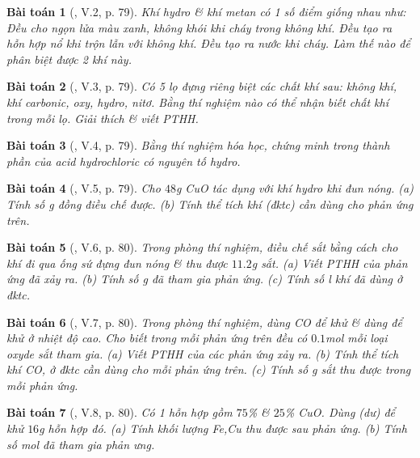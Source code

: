 \documentclass{article}
\newtheorem{baitoan}{Bài toán}
\begin{document}
\begin{baitoan}[\cite{Truong_BTNC_Hoa_Hoc_8_2022}, V.2, p. 79]
	Khí hydro \& khí metan có 1 số điểm giống nhau như: Đều cho ngọn lửa màu xanh, không khói khi cháy trong không khí. Đều tạo ra hỗn hợp nổ khi trộn lẫn với không khí. Đều tạo ra nước khi cháy. Làm thế nào để phân biệt được 2 khí này.
\end{baitoan}

\begin{baitoan}[\cite{Truong_BTNC_Hoa_Hoc_8_2022}, V.3, p. 79]
	Có 5 lọ đựng riêng biệt các chất khí sau: không khí, khí carbonic, oxy, hydro, nitơ. Bằng thí nghiệm nào có thể nhận biết chất khí trong mỗi lọ. Giải thích \& viết PTHH.
\end{baitoan}

\begin{baitoan}[\cite{Truong_BTNC_Hoa_Hoc_8_2022}, V.4, p. 79]
	Bằng thí nghiệm hóa học, chứng minh trong thành phần của acid hydrochloric có nguyên tố hydro.
\end{baitoan}

\begin{baitoan}[\cite{Truong_BTNC_Hoa_Hoc_8_2022}, V.5, p. 79]
	Cho $48$\emph{g CuO} tác dụng với khí hydro khi đun nóng. (a) Tính số \emph{g} đồng điều chế được. (b) Tính thể tích khí \emph{} (đktc) cần dùng cho phản ứng trên.
\end{baitoan}

\begin{baitoan}[\cite{Truong_BTNC_Hoa_Hoc_8_2022}, V.6, p. 80]
	Trong phòng thí nghiệm, điều chế sắt bằng cách cho khí \emph{} đi qua ống sứ đựng \emph{} đun nóng \& thu được $11.2$\emph{g} sắt. (a) Viết PTHH của phản ứng đã xảy ra. (b) Tính số \emph{g } đã tham gia phản ứng. (c) Tính số \emph{l} khí \emph{} đã dùng ở đktc.
\end{baitoan}

\begin{baitoan}[\cite{Truong_BTNC_Hoa_Hoc_8_2022}, V.7, p. 80]
	Trong phòng thí nghiệm, dùng \emph{CO} để khử \emph{} \& dùng \emph{} để khử \emph{} ở nhiệt độ cao. Cho biết trong mỗi phản ứng trên đều có $0.1$\emph{mol} mỗi loại oxyde sắt tham gia. (a) Viết PTHH của các phản ứng xảy ra. (b) Tính thể tích khí \emph{CO,} ở đktc cần dùng cho mỗi phản ứng trên. (c) Tính số \emph{g} sắt thu được trong mỗi phản ứng. 
\end{baitoan}

\begin{baitoan}[\cite{Truong_BTNC_Hoa_Hoc_8_2022}, V.8, p. 80]
	Có 1 hỗn hợp gồm $75$\% \emph{} \& $25$\% \emph{CuO}. Dùng \emph{} (dư) để khử $16$\emph{g} hỗn hợp đó. (a) Tính khối lượng \emph{Fe,Cu} thu được sau phản ứng. (b) Tính số mol \emph{} đã tham gia phản ưng.
\end{baitoan}
\end{document}
